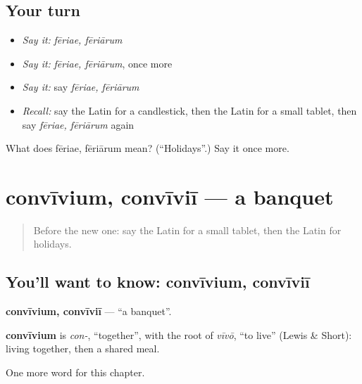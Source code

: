 \subsection*{Your turn}
\begin{itemize}
\raggedright
  \item \emph{Say it:} \emph{fēriae, fēriārum}
  \item \emph{Say it:} \emph{fēriae, fēriārum}, once more
  \item \emph{Say it:} say \emph{fēriae, fēriārum}
  \item \emph{Recall:} say the Latin for a candlestick, then the Latin for a small tablet, then say \emph{fēriae, fēriārum} again
\end{itemize}

\begin{tcolorbox}[breakable,colback=teal!4,colframe=teal!35!black,title={Before you move on}]
What does fēriae, fēriārum mean? (\textquotedblleft{}Holidays\textquotedblright{}.) Say it once more.
\end{tcolorbox}
\section[convīvium, convīviī]{convīvium, convīviī — a banquet}

\label{lesson:LA-C253-convivium}



\begin{quote}
Before the new one: say the Latin for a small tablet, then the Latin for holidays.
\end{quote}

\subsection*{You'll want to know: convīvium, convīviī}
\textbf{convīvium, convīviī} — \textquotedblleft{}a banquet\textquotedblright{}.

\begin{cousinweb}
\textbf{convīvium} is \emph{con-}, \textquotedblleft{}together\textquotedblright{}, with the root of \emph{vīvō}, \textquotedblleft{}to live\textquotedblright{} (Lewis \& Short): living together, then a shared meal.
\end{cousinweb}

\begin{grammarlens}[title={What you've built}]
One more word for this chapter.
\end{grammarlens}

